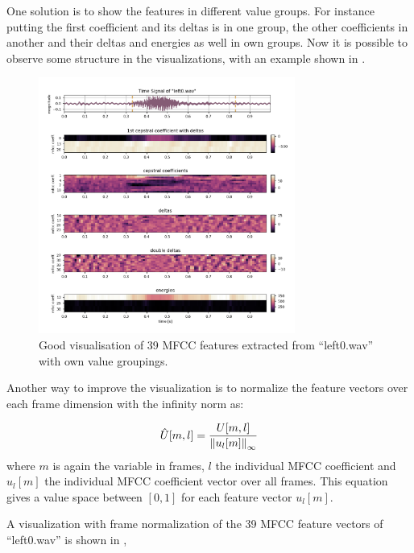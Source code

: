 One solution is to show the features in different value groups. 
For instance putting the first coefficient and its deltas is in one group, the other coefficients in another and their deltas and energies as well in own groups. 
Now it is possible to observe some structure in the visualizations, with an example shown in .

\begin{figure}[!ht]
  \centering
    \includegraphics[width=0.75\textwidth]{./3_signal/figs/signal_mfcc_left0_norm0.png}
  \caption{Good visualisation of 39 MFCC features extracted from \enquote{left0.wav} with own value groupings.}
  \label{fig:left0_order}
\end{figure}
\FloatBarrier
\noindent
Another way to improve the visualization is to normalize the feature vectors over each frame dimension with the infinity norm as:

\begin{equation}\label{eq:signal_mfcc_norm}
  \hat{U}[m, l] = \frac{U[m, l]}{\norm{u_l[m]}_\infty}
\end{equation}
where $m$ is again the variable in frames, $l$ the individual MFCC coefficient and $u_l[m]$ the individual MFCC coefficient vector over all frames.
This equation gives a value space between $[0, 1]$ for each feature vector $u_l[m]$.

A visualization with frame normalization of the 39 MFCC feature vectors of \enquote{left0.wav} is shown in ,

